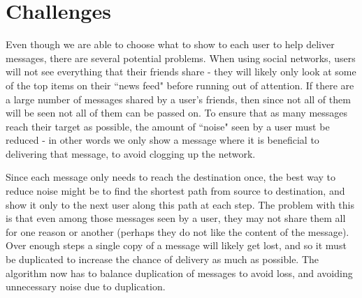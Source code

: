 \documentclass[bsc,frontabs,twoside,singlespacing,parskip,deptreport]{infthesis}     %
\begin{document}
\section{Challenges}
Even though we are able to choose what to show to each user to help deliver messages, there are several potential problems. When using social networks, users will not see everything that their friends share - they will likely only look at some of the top items on their ``news feed" before running out of attention. If there are a large number of messages shared by a user's friends, then since not all of them will be seen not all of them can be passed on. To ensure that as many messages reach their target as possible, the amount of ``noise" seen by a user must be reduced - in other words we only show a message  where it is beneficial to delivering that message, to avoid clogging up the network.

Since each message only needs to reach the destination once, the best way to reduce noise might be to find the shortest path from source to destination, and show it only to the next user along this path at each step. The problem with this is that even among those messages seen by a user, they may not share them all for one reason or another (perhaps they do not like the content of the message). Over enough steps a single copy of a message will likely get lost, and so it must be duplicated to increase the chance of delivery as much as possible. The algorithm now has to balance duplication of messages to avoid loss, and avoiding unnecessary noise due to duplication.
\end{document}
